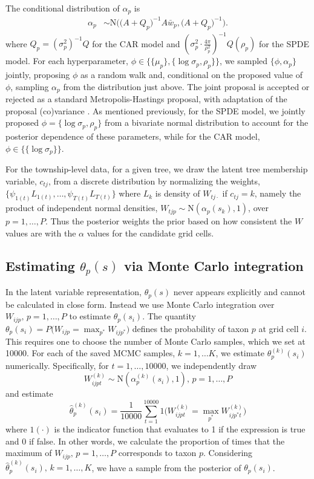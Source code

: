 \documentclass[12pt]{article}\usepackage[]{graphicx}\usepackage[]{color}
\begin{document}
The conditional distribution of $\alpha_{p}$ is 
\begin{align}
\alpha_{p} & \sim\mbox{N}\bigg(\Big(A+Q_{p}\Big)^{-1}A\bar{w}_{p},\Big(A+Q_{p}\Big)^{-1}\bigg).\label{sampalpha}
\end{align}
where $Q_{p}=(\sigma_{p}^{2})^{-1}Q$ for the CAR model and $\left(\sigma_{p}^{2}\cdot\frac{4\pi}{\rho_{p}^{2}}\right)^{-1}Q(\rho_{p})$
for the SPDE model. For each hyperparameter, $\phi\in\{\{\mu_{p}\},\{\log\sigma_{p},\rho_{p}\}\}$,
we sampled $\{\phi,\alpha_{p}\}$ jointly, proposing $\phi$ as a
random walk and, conditional on the proposed value of $\phi$, sampling
$\alpha_{p}$ from the distribution just above. The joint proposal
is accepted or rejected as a standard Metropolis-Hastings proposal,
with adaptation of the proposal (co)variance \citep{Shab:Well:2011}.
As mentioned previously, for the SPDE model, we jointly proposed $\phi=\{\log\sigma_{p},\rho_{p}\}$
from a bivariate normal distribution to account for the posterior
dependence of these parameters, while for the CAR model, $\phi\in\{\{\log\sigma_{p}\}\}$. 

\noindent 

For the township-level data, for a given tree, we draw the latent
tree membership variable, $c_{tj}$, from a discrete distribution
by normalizing the weights, $\{\psi_{1(t)}L_{1(t)},\ldots,\psi_{T(t)}L_{T(t)}\}$
where $L_{k}$ is density of $W_{tj\cdot}$ if $c_{tj}=k$, namely
the product of independent normal densities, $W_{tjp}\sim\mbox{N}(\alpha_{p}(s_{k}),1)$,
over $p=1,\ldots,P$. Thus the posterior weights the prior based on
how consistent the $W$ values are with the $\alpha$ values for the
candidate grid cells. 




\subsection{Estimating $\theta_{p}(s)$ via Monte Carlo integration}

In the latent variable representation, $\theta_{p}(s)$ never appears
explicitly and cannot be calculated in close form. Instead we use
Monte Carlo integration over $W_{ijp},\, p=1,\ldots,P$ to estimate
$\theta_{p}(s_{i})$. The quantity $\theta_{p}(s_{i})=P(W_{ijp}={\displaystyle \max_{p^{*}}W_{ijp^{*}})}$
defines the probability of taxon $p$ at grid cell $i$. This requires
one to choose the number of Monte Carlo samples, which we set at 10000.
For each of the saved MCMC samples, $k=1,\ldots K$, we estimate $\theta_{p}^{(k)}(s_{i})$
numerically. Specifically, for $t=1,\ldots,10000$, we independently
draw
\[
W_{ijpt}^{(k)}\sim\mbox{N}(\alpha_{p}^{(k)}(s_{i}),1),\, p=1,\ldots,P
\]
and estimate 
\[
\hat{\theta}_{p}^{(k)}(s_{i})=\frac{1}{10000}{\displaystyle \sum_{t=1}^{10000}1(W_{ijpt}^{(k)}={\displaystyle \max_{p^{*}}W_{ijp^{*}t}^{(k)})}}
\]
where $1(\cdot)$ is the indicator function that evaluates to 1 if
the expression is true and 0 if false. In other words, we calculate
the proportion of times that the maximum of $W_{ijp},\, p=1,\ldots,P$
corresponds to taxon $p$. Considering $\hat{\theta}_{p}^{(k)}(s_{i}),\, k=1,\ldots,K$,
we have a sample from the posterior of $\theta_{p}(s_{i})$.
\end{document}
